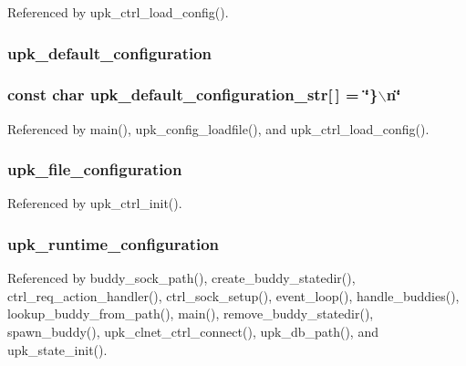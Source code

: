 Referenced by upk\_\-ctrl\_\-load\_\-config().

\subsubsection[{upk\_\-default\_\-configuration}]{ {\bf upk\_\-default\_\-configuration}}\label{group__config__impl_gaefda54e715b67195adc6ee3b56671e56}
\subsubsection[{upk\_\-default\_\-configuration\_\-str}]{\setlength{\rightskip}{0pt plus 5cm}const char {\bf upk\_\-default\_\-configuration\_\-str}[$\,$] = \char`\"{}\}$\backslash$n\char`\"{}}\label{group__config__impl_ga295298f54e6d77eee6df85c725e3465a}


Referenced by main(), upk\_\-config\_\-loadfile(), and upk\_\-ctrl\_\-load\_\-config().

\subsubsection[{upk\_\-file\_\-configuration}]{ {\bf upk\_\-file\_\-configuration}}\label{group__config__impl_ga63e376b66da63c0b37258f999eff12f8}


Referenced by upk\_\-ctrl\_\-init().

\subsubsection[{upk\_\-runtime\_\-configuration}]{ {\bf upk\_\-runtime\_\-configuration}}\label{group__config__impl_gaf7638ba77297c6ad954805d92fa33c13}


Referenced by buddy\_\-sock\_\-path(), create\_\-buddy\_\-statedir(), ctrl\_\-req\_\-action\_\-handler(), ctrl\_\-sock\_\-setup(), event\_\-loop(), handle\_\-buddies(), lookup\_\-buddy\_\-from\_\-path(), main(), remove\_\-buddy\_\-statedir(), spawn\_\-buddy(), upk\_\-clnet\_\-ctrl\_\-connect(), upk\_\-db\_\-path(), and upk\_\-state\_\-init().


